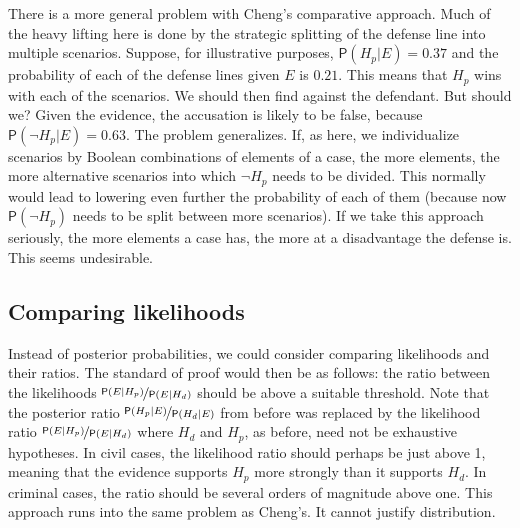 \documentclass[
  10pt,
  dvipsnames,enabledeprecatedfontcommands]{scrartcl}
\newcommand{\n}{\neg}
\newcommand{\pr}[1]{\ensuremath{\mathsf{P}(#1)}}
\begin{document}
There is a more general problem with Cheng's comparative approach. Much
of the heavy lifting here is done by the strategic splitting of the
defense line into multiple scenarios. Suppose, for illustrative
purposes, \(\pr{H_p\vert E}=0.37\) and the probability of each of the
defense lines given \(E\) is \(0.21\). This means that \(H_p\) wins with
each of the scenarios. We should then find against the defendant. But
should we? Given the evidence, the accusation is likely to be false,
because \(\pr{\n H_p \vert E}=0.63\). The problem generalizes. If, as
here, we individualize scenarios by Boolean combinations of elements of
a case, the more elements, the more alternative scenarios into which
\(\n H_p\) needs to be divided. This normally would lead to lowering
even further the probability of each of them (because now
\(\pr{\n H_p}\) needs to be split between more scenarios). If we take
this approach seriously, the more elements a case has, the more at a
disadvantage the defense is. This seems undesirable.

\hypertarget{comparing-likelihoods}{%
\subsection{Comparing likelihoods}\label{comparing-likelihoods}}

Instead of posterior probabilities, we could consider comparing
likelihoods and their ratios. The standard of proof would then be as
follows: the ratio between the likelihoods
\(\nicefrac{\pr{E \vert H_p}}{\pr{E \vert H_d}}\) should be above a
suitable threshold. Note that the posterior ratio
\(\nicefrac{\pr{H_p \vert E}}{\pr{H_d \vert E}}\) from before was
replaced by the likelihood ratio
\(\nicefrac{\pr{E \vert H_p}}{\pr{E \vert H_d}}\) where \(H_d\) and
\(H_p\), as before, need not be exhaustive hypotheses. In civil cases,
the likelihood ratio should perhaps be just above 1, meaning that the
evidence supports \(H_p\) more strongly than it supports \(H_d\). In
criminal cases, the ratio should be several orders of magnitude above
one. This approach runs into the same problem as Cheng's. It cannot
justify distribution.
\end{document}
